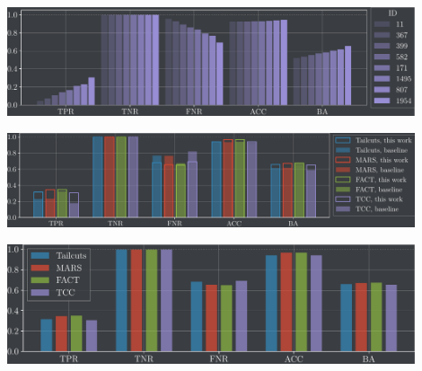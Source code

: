 \begin{frame}
    \centering
    \includegraphics[width=0.9\textwidth]{build/metrics_tcc.pdf}
\end{frame}



\begin{frame}
    \centering
    \includegraphics[width=0.9\textwidth]{build/metrics_baseline.pdf}
\end{frame}

\begin{frame}
    \centering
    \includegraphics[width=0.9\textwidth]{build/metrics_all.pdf}
\end{frame}